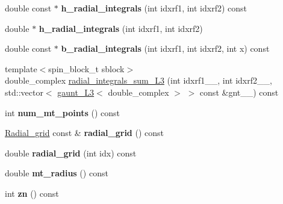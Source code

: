 \begin{DoxyCompactItemize}
\item 
\hypertarget{classsirius_1_1_atom_a602d7aa17f5980ca40b109b86d693a95}{}double const $\ast$ {\bfseries h\+\_\+radial\+\_\+integrals} (int idxrf1, int idxrf2) const \label{classsirius_1_1_atom_a602d7aa17f5980ca40b109b86d693a95}

\item 
\hypertarget{classsirius_1_1_atom_a007f647eb25196ca354dc2dd62eebd76}{}double $\ast$ {\bfseries h\+\_\+radial\+\_\+integrals} (int idxrf1, int idxrf2)\label{classsirius_1_1_atom_a007f647eb25196ca354dc2dd62eebd76}

\item 
\hypertarget{classsirius_1_1_atom_afc112bad6e35c3ab5e6ef21b74b140da}{}double const $\ast$ {\bfseries b\+\_\+radial\+\_\+integrals} (int idxrf1, int idxrf2, int x) const \label{classsirius_1_1_atom_afc112bad6e35c3ab5e6ef21b74b140da}

\item 
{\footnotesize template$<$spin\+\_\+block\+\_\+t sblock$>$ }\\double\+\_\+complex \hyperlink{classsirius_1_1_atom_adc21de2bf837b490a37667971ead7e10}{radial\+\_\+integrals\+\_\+sum\+\_\+\+L3} (int idxrf1\+\_\+\+\_\+, int idxrf2\+\_\+\+\_\+, std\+::vector$<$ \hyperlink{structsirius_1_1gaunt___l3}{gaunt\+\_\+\+L3}$<$ double\+\_\+complex $>$ $>$ const \&gnt\+\_\+\+\_\+) const 
\item 
\hypertarget{classsirius_1_1_atom_aaf2d3818c448366bc65382e8936c05a8}{}int {\bfseries num\+\_\+mt\+\_\+points} () const \label{classsirius_1_1_atom_aaf2d3818c448366bc65382e8936c05a8}

\item 
\hypertarget{classsirius_1_1_atom_a5cea061dfddde6e247bebad478c17ac2}{}\hyperlink{classsirius_1_1_radial__grid}{Radial\+\_\+grid} const \& {\bfseries radial\+\_\+grid} () const \label{classsirius_1_1_atom_a5cea061dfddde6e247bebad478c17ac2}

\item 
\hypertarget{classsirius_1_1_atom_ab34f072a7dd652a548e4671f92a9f3bc}{}double {\bfseries radial\+\_\+grid} (int idx) const \label{classsirius_1_1_atom_ab34f072a7dd652a548e4671f92a9f3bc}

\item 
\hypertarget{classsirius_1_1_atom_a1169fd8120f2d8b4b089eb8667baba7b}{}double {\bfseries mt\+\_\+radius} () const \label{classsirius_1_1_atom_a1169fd8120f2d8b4b089eb8667baba7b}

\item 
\hypertarget{classsirius_1_1_atom_ae0920a111324ab5c9bc1e4a6bbb712e0}{}int {\bfseries zn} () const \label{classsirius_1_1_atom_ae0920a111324ab5c9bc1e4a6bbb712e0}


\end{DoxyCompactItemize}
